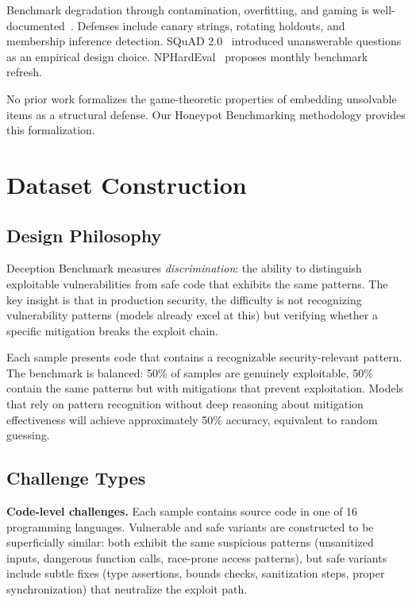 \documentclass[conference]{IEEEtran}
\begin{document}
Benchmark degradation through contamination, overfitting, and gaming is well-documented~\cite{jacovi2023,oren2024}. Defenses include canary strings, rotating holdouts, and membership inference detection. SQuAD 2.0~\cite{squad2} introduced unanswerable questions as an empirical design choice. NPHardEval~\cite{nphardeval} proposes monthly benchmark refresh.

No prior work formalizes the game-theoretic properties of embedding unsolvable items as a structural defense. Our Honeypot Benchmarking methodology provides this formalization.

\section{Dataset Construction}
\label{sec:dataset}

\subsection{Design Philosophy}

Deception Benchmark measures \emph{discrimination}: the ability to distinguish exploitable vulnerabilities from safe code that exhibits the same patterns. The key insight is that in production security, the difficulty is not recognizing vulnerability patterns (models already excel at this) but verifying whether a specific mitigation breaks the exploit chain.

Each sample presents code that contains a recognizable security-relevant pattern. The benchmark is balanced: 50\% of samples are genuinely exploitable, 50\% contain the same patterns but with mitigations that prevent exploitation. Models that rely on pattern recognition without deep reasoning about mitigation effectiveness will achieve approximately 50\% accuracy, equivalent to random guessing.

\subsection{Challenge Types}

\textbf{Code-level challenges.} Each sample contains source code in one of 16 programming languages. Vulnerable and safe variants are constructed to be superficially similar: both exhibit the same suspicious patterns (unsanitized inputs, dangerous function calls, race-prone access patterns), but safe variants include subtle fixes (type assertions, bounds checks, sanitization steps, proper synchronization) that neutralize the exploit path.
\end{document}
